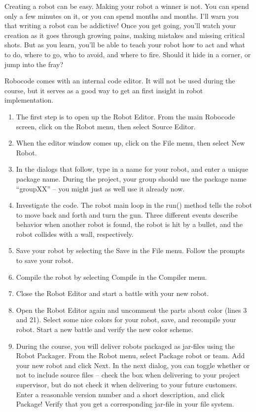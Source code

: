 \documentclass{scrreprt}
\begin{document}
Creating a robot can be easy. Making your robot a winner is not. You can spend only a few minutes on it, or you can spend months and months. I'll warn you that writing a robot can be addictive! Once you get going, you'll watch your creation as it goes through growing pains, making mistakes and missing critical shots. But as you learn, you'll be able to teach your robot how to act and what to do, where to go, who to avoid, and where to fire. Should it hide in a corner, or jump into the fray?

Robocode comes with an internal code editor. It will not be used during the course, but it serves as a good way to get an first insight in robot implementation.

\begin{enumerate}
\item The first step is to open up the Robot Editor. From the main Robocode screen, click on the Robot menu, then select Source Editor.
\item When the editor window comes up, click on the File menu, then select New Robot. 
\item In the dialogs that follow, type in a name for your robot, and enter a unique package name. During the project, your group should use the package name ``groupXX'' -- you might just as well use it already now.
\item Investigate the code. The robot main loop in the run() method tells the robot to move back and forth and turn the gun. Three different events describe behavior when another robot is found, the robot is hit by a bullet, and the robot collides with a wall, respectively.
\item Save your robot by selecting the Save in the File menu. Follow the prompts to save your robot. 
\item Compile the robot by selecting Compile in the Compiler menu.
\item Close the Robot Editor and start a battle with your new robot.
\item Open the Robot Editor again and uncomment the parts about color (lines 3 and 21). Select some nice colors for your robot, save, and recompile your robot. Start a new battle and verify the new color scheme. 
\item During the course, you will deliver robots packaged as jar-files using the Robot Packager. From the Robot menu, select Package robot or team. Add your new robot and click Next. In the next dialog, you can toggle whether or not to include source files -- check the box when delivering to your project supervisor, but do not check it when delivering to your future customers. Enter a reasonable version number and a short description, and click Package! Verify that you get a corresponding jar-file in your file system.
\end{enumerate}
\end{document}
